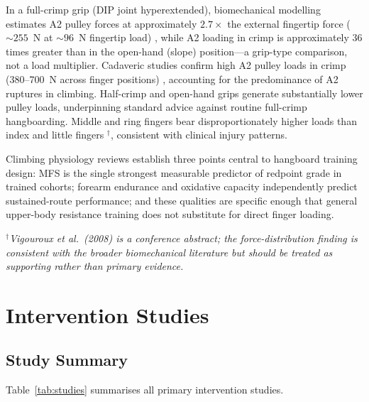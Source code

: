 \documentclass[12pt,a4paper]{article}
\begin{document}
In a full-crimp grip (DIP joint hyperextended), biomechanical modelling estimates A2 pulley forces at approximately $2.7\times$ the external fingertip force (${\sim}255$~N at ${\sim}96$~N fingertip load) \cite{vigouroux2006}, while A2 loading in crimp is approximately 36 times greater than in the open-hand (slope) position---a grip-type comparison, not a load multiplier. Cadaveric studies confirm high A2 pulley loads in crimp (380--700~N across finger positions) \cite{schweizer2001}, accounting for the predominance of A2 ruptures in climbing. Half-crimp and open-hand grips generate substantially lower pulley loads, underpinning standard advice against routine full-crimp hangboarding. Middle and ring fingers bear disproportionately higher loads than index and little fingers \cite{vigouroux2008}$^{\dagger}$, consistent with clinical injury patterns.

Climbing physiology reviews \cite{watts2004,macleod2007,fryer2016} establish three points central to hangboard training design: MFS is the single strongest measurable predictor of redpoint grade in trained cohorts; forearm endurance and oxidative capacity independently predict sustained-route performance; and these qualities are specific enough that general upper-body resistance training does not substitute for direct finger loading.

\smallskip
\noindent$^{\dagger}$\textit{Vigouroux et al.\ (2008) \cite{vigouroux2008} is a conference abstract; the force-distribution finding is consistent with the broader biomechanical literature but should be treated as supporting rather than primary evidence.}

\section{Intervention Studies}

\subsection{Study Summary}

Table~\ref{tab:studies} summarises all primary intervention studies.
\end{document}
